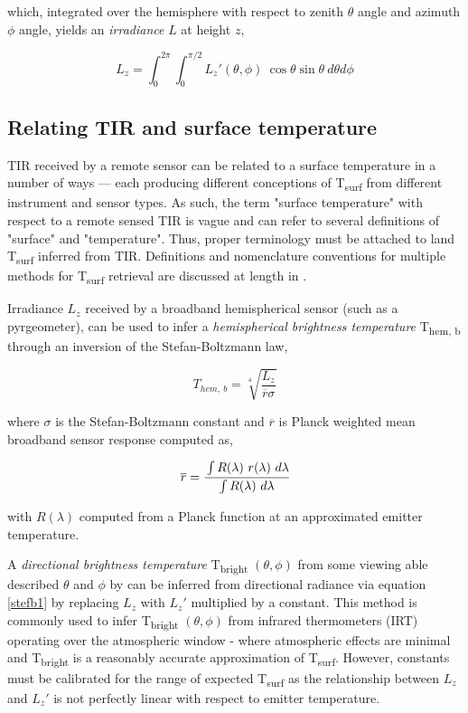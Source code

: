 \noindent which, integrated over the hemisphere with respect to zenith \(\theta\) angle and azimuth \(\phi\) angle, yields an \textit{irradiance} $ L $ at height $ z $,

\begin{equation}
L_z = \int_{0}^{2\pi} \int_{0}^{\pi/2} L_z'(\theta, \phi) ~ \cos\theta \sin\theta ~ d\theta d\phi
\end{equation}

\subsection{Relating TIR and surface temperature}

TIR received by a remote sensor can be related to a surface temperature in a number of ways --- each producing different conceptions of T\textsubscript{surf} from different instrument and sensor types. As such, the term "surface temperature" with respect to a remote sensed TIR is vague and can refer to several definitions of "surface" and "temperature". Thus, proper terminology must be attached to land T\textsubscript{surf} inferred from TIR. Definitions and nomenclature conventions for multiple methods for T\textsubscript{surf} retrieval are discussed at length in \citet{Norman1995}.

 Irradiance $L_z$ received by a broadband hemispherical sensor (such as a pyrgeometer), can be used to infer a \textit{hemispherical brightness temperature} T\textsubscript{hem, b} through an inversion of the Stefan-Boltzmann law,

\begin{equation}
\label{stefb1}
T_{hem,~ b} = \sqrt[4]{\frac{L_z}{\overline{r}\sigma}}
\end{equation}

\noindent where $ \sigma $ is the Stefan-Boltzmann constant and $ \overline{r} $ is Planck weighted mean broadband sensor response computed as,

\begin{equation}
\label{meansens}
\overline{r} = \cfrac{\int R(\lambda) ~ r(\lambda)~d\lambda}{\int R(\lambda) ~ d\lambda}
\end{equation}

\noindent with $ R(\lambda) $ computed from a Planck function at an approximated emitter temperature. 

A \textit{directional brightness temperature} T\textsubscript{bright} $(\theta, \phi)$ from some viewing able described $\theta$ and $\phi$ by can be inferred from directional radiance via equation \ref{stefb1} by replacing $ L_z $ with $L_z'$ multiplied by a constant. This method is commonly used to infer T\textsubscript{bright} $(\theta, \phi)$ from infrared thermometers (IRT) operating over the atmospheric window - where atmospheric effects are minimal and T\textsubscript{bright} is a reasonably accurate approximation of T\textsubscript{surf}. However, constants must be calibrated for the range of expected T\textsubscript{surf} as the relationship between $ L_z $ and $L_z'$  is not perfectly linear with respect to emitter temperature.


